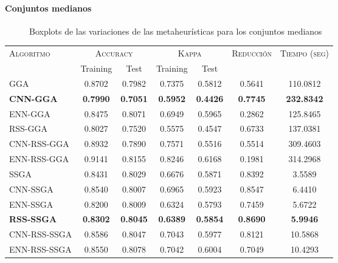 \paragraph{Conjuntos medianos}

\begin{figure}[h!]

	\centering

\caption{Boxplots de las variaciones de las metaheurísticas para los conjuntos medianos}
\label{medium-all}
\end{figure}

\begin{table}[h!]
\centering
\begin{tabular}{l c c c c c c}
\hline
\multirow{2}{*}{\textsc{Algoritmo}}
	& \multicolumn{2}{c}{\textsc{Accuracy}}
	& \multicolumn{2}{c}{\textsc{Kappa}}
	& \textsc{Reducción}
	& \textsc{Tiempo (seg)} \\
	& Training & Test
	& Training & Test \\ 
\hline
\hline

GGA         & 0.8702 & 0.7982 & 0.7375 & 0.5812 & 0.5641 & 110.0812 \\
\textbf{CNN-GGA}     & \textbf{0.7990} & \textbf{0.7051} & \textbf{0.5952} & \textbf{0.4426} & \textbf{0.7745} & \textbf{232.8342} \\
ENN-GGA     & 0.8475 & 0.8071 & 0.6949 & 0.5965 & 0.2862 & 125.8465 \\
RSS-GGA     & 0.8027 & 0.7520 & 0.5575 & 0.4547 & 0.6733 & 137.0381 \\
CNN-RSS-GGA & 0.8932 & 0.7890 & 0.7571 & 0.5516 & 0.5514 & 309.4603 \\
ENN-RSS-GGA & 0.9141 & 0.8155 & 0.8246 & 0.6168 & 0.1981 & 314.2968 \\

\hline

SSGA & 0.8431 & 0.8029 & 0.6676 & 0.5871 & 0.8392 & 3.5589 \\
CNN-SSGA & 0.8540 & 0.8007 & 0.6965 & 0.5923 & 0.8547 & 6.4410 \\
ENN-SSGA & 0.8200 & 0.8009 & 0.6324 & 0.5793 & 0.7459 & 5.6722 \\
\textbf{RSS-SSGA} & \textbf{0.8302} & \textbf{0.8045} & \textbf{0.6389} & \textbf{0.5854} & \textbf{0.8690} & \textbf{5.9946} \\
CNN-RSS-SSGA & 0.8586 & 0.8047 & 0.7043 & 0.5977 & 0.8121 & 10.5868 \\
ENN-RSS-SSGA & 0.8550 & 0.8078 & 0.7042 & 0.6004 & 0.7049 & 10.4293 \\


\end{tabular}
\end{table}
